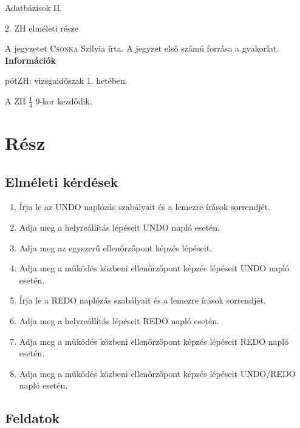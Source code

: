 \documentclass[a4paper,11.5pt, table]{article}
\begin{document}
	\begin{center}
		{\LARGE Adatbázisok II.}
		\smallskip
		
		{\large 2. ZH elméleti része}
	\end{center}
	A jegyzetet \textsc{Csonka} Szilvia írta. A jegyzet első számú forrása a gyakorlat.\\
	
	
	
	
	
{\large \textbf{Információk}}
	\begin{compactitem}
		\item pótZH: vizsgaidőszak 1. hetében.
		\item A ZH $\frac{1}{4}$ 9-kor kezdődik.
	\end{compactitem}
	
\section{Rész}

\subsection{Elméleti kérdések}
\begin{enumerate}
	\item Írja le az UNDO naplózás szabályait és a lemezre írások sorrendjét.
	
	\item Adja meg a helyreállítás lépéseit UNDO napló esetén.
	
	\item Adja meg az egyszerű ellenőrzőpont képzés lépéseit.
	
	\item Adja meg a működés közbeni ellenőrzőpont képzés lépéseit UNDO napló esetén.
	
	\item Írja le a REDO naplózás szabályait és a lemezre írások sorrendjét.
	
	\item Adja meg a helyreállítás lépéseit REDO napló esetén.
	
	\item Adja meg a működés közbeni ellenőrzőpont képzés lépéseit REDO napló esetén.
	
	\item Adja meg a működés közbeni ellenőrzőpont képzés lépéseit UNDO/REDO napló esetén.
\end{enumerate}

\subsection{Feldatok}
	
\end{document}
